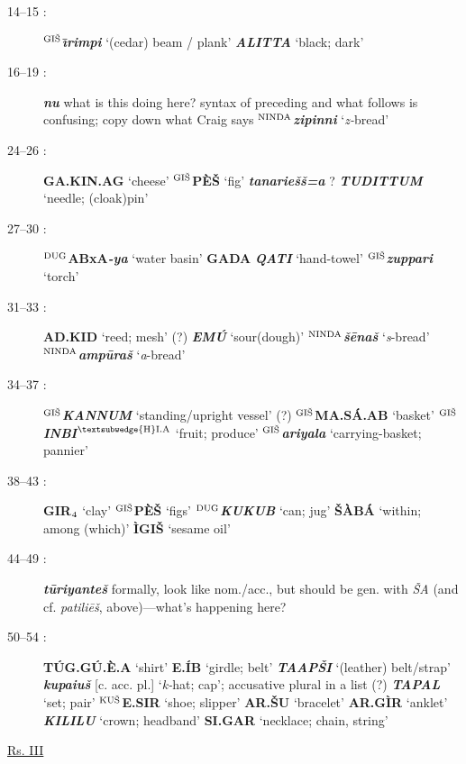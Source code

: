 \documentclass[10pt]{article}
\newcommand{\supersc}[1]{$^{\textrm{\scriptsize{#1}}}$}  	%
\newcommand{\subsc}[1]{$_{\textrm{\scriptsize{#1}}}$}	%
\newcommand{\bit}[1]{\textbf{\textit{#1}}}				%
\newcommand{\p}[1]{{\tiny[{#1}]}}					%
\newcommand{\I}{\={\i}}									%
\newcommand{\hith}{\textsubwedge{h}}
\newcommand{\Hith}{\textsubwedge{H}}
\newcommand{\hpl}{\supersc{{\Hith}I.A}}
\newcommand{\wood}{\supersc{GI\v{S}}}
\newcommand{\bread}{\supersc{NINDA}}
\newcommand{\vessel}{\supersc{DUG}}
\renewcommand{\.}[1]{\textsubdot{#1}}
\begin{document}
\begin{description}
\item[14--15 :] \textbf{\wood}\bit{{\I}rimpi} `(cedar) beam / plank' \bit{ALITTA} `black; dark'

\item[16--19 :] \bit{nu} what is this doing here? syntax of preceding and what follows is confusing; copy down what Craig says \textbf{\bread}\bit{zipinni} `\textit{z-}bread'

\item[24--26 :] \textbf{GA.KIN.AG} `cheese' \textbf{{\wood}P\`E\v{S}} `fig' \bit{tan{\hith}arie\v{s}\v{s}=a} ? \bit{TUDITTUM} `needle; (cloak)pin'

\item[27--30 :] \textbf{\supersc{DUG}ABxA}\bit{-ya} `water basin' \textbf{GADA}\bit{ QATI} `hand-towel' \textbf{\wood}\bit{zuppari} `torch'

\item[31--33 :] \textbf{AD.KID} `reed; mesh' (?) \bit{EM\'U} `sour(dough)' \textbf{\bread}\bit{\v{s}\=ena\v{s}} `\textit{s}-bread' \textbf{\bread}\bit{amp\=ura\v{s}} `\textit{a}-bread' 

\item[34--37 :] \textbf{\wood}\bit{KANNUM} `standing/upright vessel' (?) \textbf{{\wood}MA.S\'A.AB} `basket' \textbf{{\wood}}\bit{INBI}\textbf{\hpl} `fruit; produce' \textbf{\wood}\bit{ariyala} `carrying-basket; pannier' 

\item[38--43 :] \textbf{GIR\subsc{4}} `clay' \textbf{{\wood}P\`E\v{S}} `figs' \textbf{\vessel}\bit{KUKUB} `can; jug' \textbf{\v{S}\`AB\'A} `within; among (which)' \textbf{\`IGI\v{S}} `sesame oil'

\item[44--49 :] \bit{t\=uriyante\v{s}} formally, look like nom./acc., but should be gen. with \textit{\v{S}A} (and cf. \textit{patili\=e\v{s}}, above)---what's happening here?

\item[50--54 :] \textbf{T\'UG.G\'U.\`E.A} `shirt' \textbf{E.\'IB} `girdle; belt' \bit{TA{\Hith}AP\v{S}I} `(leather) belt/strap' \bit{kupa{\hith}iu\v{s}} \p{c. acc. pl.} `\textit{k-}hat; cap'; accusative plural in a list (?) \bit{TAPAL} `set; pair' \textbf{\supersc{KU\v{S}}E.SIR} `shoe; slipper' \textbf{{\Hith}AR.\v{S}U} `bracelet' \textbf{{\Hith}AR.G\`IR} `anklet' \bit{KILILU} `crown; headband' \textbf{SI.GAR} `necklace; chain, string'

\bigskip
\item[\underline{Rs. III}]
\bigskip


\end{description}
\end{document}
